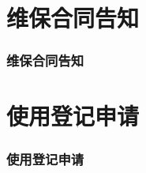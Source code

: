 \documentclass[hyperref={bookmarks=false},aspectratio=169]{beamer}
\begin{document}
\section{维保合同告知}


\begin{frame}
\frametitle{维保合同告知}

\begin{figure}[ht!]

\end{figure}

\end{frame}

\section{使用登记申请}


\begin{frame}
\frametitle{使用登记申请}

\begin{figure}[ht!]

\end{figure}

\end{frame}
\end{document}
